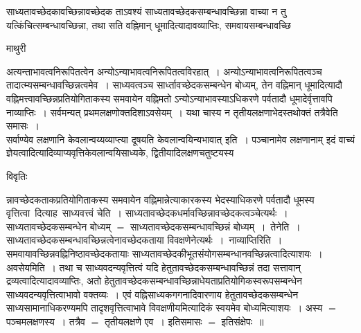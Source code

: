 \documentclass[10pt, openany]{book}
\begin{document}
{साध्यतावच्छेदकावच्छिन्नावच्छेदक ताऽवश्यं साध्यतावच्छेदकसम्बन्धावच्छिन्ना वाच्या न तु यत्किंचित्सम्बन्धावच्छिन्ना, तथा सति वह्निमान् धूमादित्यादावव्याप्तिः, समवायसम्बन्धावच्छि
\newpage
\begin{center}  माथुरी  \end{center} 
{\la अत्यन्ताभावत्वनिरूपितत्वेन अन्योऽन्याभावत्वनिरूपितत्वविरहात्~। अन्योऽन्याभावत्वनिरूपितत्वञ्च तादात्म्यसम्बन्धावच्छिन्नत्वमेव~। साध्यवत्वञ्च सार्ध्तावच्छेदकसम्बन्धेन बोध्यम्, तेन वह्निमान्  धूमादित्यादौ वह्निमत्त्वावच्छिन्नप्रतियोगिताकस्य समवायेन वह्निमतो  ऽन्योऽन्याभावस्याऽधिकरणे पर्वतादौ धूमादेर्वृत्तावपि नाव्याप्तिः~। सर्वमन्यत् प्रथमलक्षणोक्तदिशाऽवसेयम्~। यथा चास्य न तृतीयलक्षणाभेदस्तथोक्तं तत्रैवेति समासः~।\\

सर्वाण्येव लक्षणानि केवलान्वय्यव्याप्त्या दूषयति {\qt केवलान्वयिन्यभावात्  इति}~। पञ्चानामेव लक्षणानाम्  इदं वाच्यं ज्ञेयत्वादित्यादिव्याप्यवृत्तिकेवलान्वयिसाध्यके, द्वितीयादिलक्षणचतुष्टयस्य }
\begin{center}     विवृतिः \end{center}
न्नावच्छेदकताकप्रतियोगिताकस्य समवायेन वह्निमान्नेत्याकारकस्य भेदस्याधिकरणे पर्वतादौ धूमस्य वृत्तित्वा\textendash\ दित्याह\textemdash\ {\la साध्यवत्त्वं चेति~।}
साध्यतावच्छेदकधर्मावच्छिन्नावच्छेदकत्वञ्चेत्यर्थः~। साध्यतावच्छेदकसम्बन्धेन बोध्यम् $=$ साध्यतावच्छेदकसम्बन्धावच्छिन्नं बोध्यम्~।~{\la तेनेति~।}
साध्यतावच्छेदकसम्बन्धावच्छिन्नत्वेनावच्छेदकताया विवक्षणेनेत्यर्थः~।~{\la नाव्याप्तिरिति~।} समवायावच्छिन्नवह्निनिष्ठावच्छेदकतायाः साध्यतावच्छेदकीभूतसंयोगसम्बन्धानवच्छिन्नत्वादित्याशयः~। अवसेयमिति~। तथा च साध्यवदन्यवृत्तित्वं यदि हेतुतावच्छेदकसम्बन्धावच्छिन्नं तदा सत्तावान् द्रव्यत्वादित्यादावव्याप्तिः, अतो हेतुतावच्छेदकसम्बन्धावच्छिन्नाधेयताप्रतियोगिकस्वरूपसम्बन्धेन साध्यवदन्यवृत्तित्वाभावो वक्तव्यः~। एवं वह्निसाध्यकगगनादिवारणाय हेतुतावच्छेदकसम्बन्धेन साध्य\textendash  सामानाधिकरण्यमपि तादृशवृत्तित्वाभावे विवक्षणीयमित्यादिकं स्वयमेव बोध्यमित्याशयः~। अस्य $=$ पञ्चमलक्षणस्य~। तत्रैव $=$ तृतीयलक्षणे एव~। इतिसमासः $=$ इतिसंक्षेपः~॥\\

}
\end{document}
